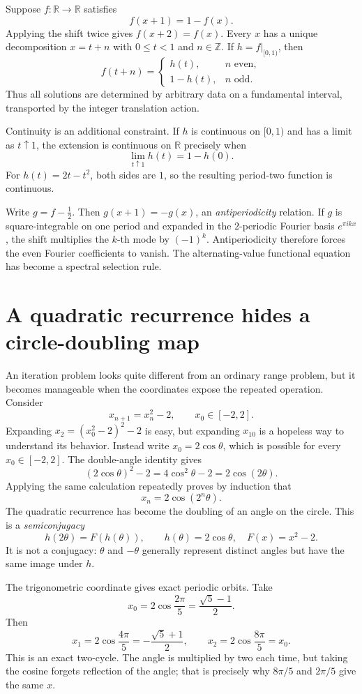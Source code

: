 Suppose \(f:\mathbb R\to\mathbb R\) satisfies
\[
 f(x+1)=1-f(x).
\]
Applying the shift twice gives \(f(x+2)=f(x)\). Every \(x\) has a unique decomposition \(x=t+n\) with \(0\le t<1\) and \(n\in\mathbb Z\). If \(h=f|_{[0,1)}\), then
\[
 f(t+n)=
 \begin{cases}
 h(t),&n\text{ even},\\
 1-h(t),&n\text{ odd}.
 \end{cases}
\]
Thus all solutions are determined by arbitrary data on a fundamental interval, transported by the integer translation action.

Continuity is an additional constraint. If \(h\) is continuous on \([0,1)\) and has a limit as \(t\uparrow1\), the extension is continuous on \(\mathbb R\) precisely when
\[
 \lim_{t\uparrow1}h(t)=1-h(0).
\]
For \(h(t)=2t-t^2\), both sides are \(1\), so the resulting period-two function is continuous.

Write \(g=f-\tfrac12\). Then \(g(x+1)=-g(x)\), an \emph{antiperiodicity} relation. If \(g\) is square-integrable on one period and expanded in the \(2\)-periodic Fourier basis \(e^{\pi ikx}\), the shift multiplies the \(k\)-th mode by \((-1)^k\). Antiperiodicity therefore forces the even Fourier coefficients to vanish. The alternating-value functional equation has become a spectral selection rule.

\section{A quadratic recurrence hides a circle-doubling map}

An iteration problem looks quite different from an ordinary range problem, but it becomes manageable when the coordinates expose the repeated operation. Consider
\[
 x_{n+1}=x_n^2-2,\qquad x_0\in[-2,2].
\]
Expanding $x_2=(x_0^2-2)^2-2$ is easy, but expanding $x_{10}$ is a hopeless way to understand its behavior. Instead write $x_0=2\cos\theta$, which is possible for every $x_0\in[-2,2]$. The double-angle identity gives
\[
 (2\cos\theta)^2-2
 =4\cos^2\theta-2
 =2\cos(2\theta).
\]
Applying the same calculation repeatedly proves by induction that
\[
 \boxed{x_n=2\cos(2^n\theta).}
\]
The quadratic recurrence has become the doubling of an angle on the circle. This is a \emph{semiconjugacy}
\[
 h(2\theta)=F(h(\theta)),\qquad
 h(\theta)=2\cos\theta,\quad F(x)=x^2-2.
\]
It is not a conjugacy: $\theta$ and $-\theta$ generally represent distinct angles but have the same image under $h$.

The trigonometric coordinate gives exact periodic orbits. Take
\[
 x_0=2\cos\frac{2\pi}{5}
 =\frac{\sqrt5-1}{2}.
\]
Then
\[
 x_1=2\cos\frac{4\pi}{5}
 =-\frac{\sqrt5+1}{2},
 \qquad
 x_2=2\cos\frac{8\pi}{5}=x_0.
\]
This is an exact two-cycle. The angle is multiplied by two each time, but taking the cosine forgets reflection of the angle; that is precisely why $8\pi/5$ and $2\pi/5$ give the same $x$.

